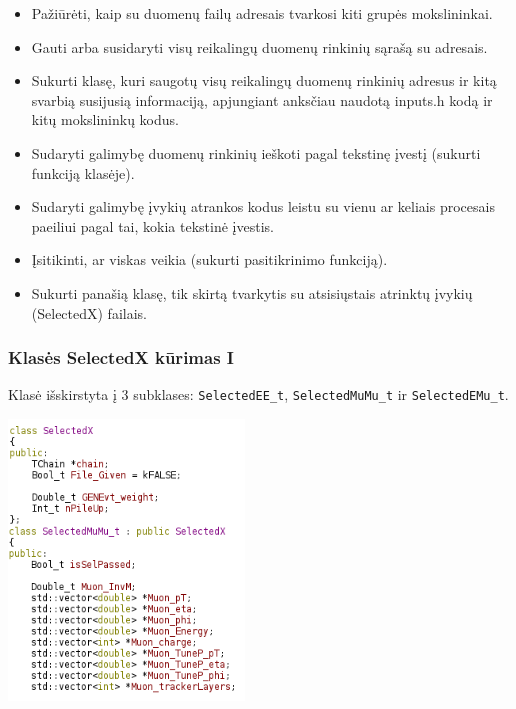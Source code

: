 \documentclass{beamer}
\begin{document}
\begin{frame}[allowframebreaks]
\begin{enumerate}
\begin{itemize}
		\item Pažiūrėti, kaip su duomenų failų adresais tvarkosi kiti grupės mokslininkai.
		\item Gauti arba susidaryti visų reikalingų duomenų rinkinių sąrašą su adresais.
		\item Sukurti klasę, kuri saugotų visų reikalingų duomenų rinkinių adresus ir kitą svarbią susijusią informaciją, apjungiant anksčiau naudotą inputs.h kodą ir kitų mokslininkų kodus.
		\item Sudaryti galimybę duomenų rinkinių ieškoti pagal tekstinę įvestį (sukurti funkciją klasėje).
		\item Sudaryti galimybę įvykių atrankos kodus leistu su vienu ar keliais procesais paeiliui pagal tai, kokia tekstinė įvestis.
		\item Įsitikinti, ar viskas veikia (sukurti pasitikrinimo funkciją).
		\item Sukurti panašią klasę, tik skirtą tvarkytis su atsisiųstais atrinktų įvykių (SelectedX) failais.
	\end{itemize}
\end{enumerate}

\end{frame}


\begin{frame}
\frametitle{Klasės SelectedX kūrimas I}


Klasė išskirstyta į 3 subklases: \texttt{SelectedEE\_t}, \texttt{SelectedMuMu\_t} ir \texttt{SelectedEMu\_t}.
\begin{center}
	\includegraphics[width=0.47\textwidth]{SelectedX.png}
\end{center}

\end{frame}
\end{document}
